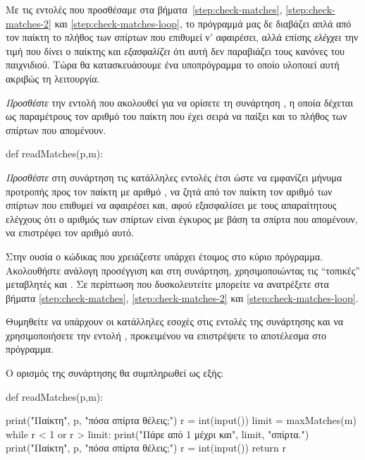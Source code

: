 \documentclass[a4paper,11pt,oneside]{book}
\begin{document}
\begin{step}
Με τις εντολές που προσθέσαμε στα βήματα~\ref{step:check-matches}, \ref{step:check-matches-2} και \ref{step:check-matches-loop}, το πρόγραμμά μας δε διαβάζει απλά από τον παίκτη το πλήθος των σπίρτων που επιθυμεί ν' αφαιρέσει, αλλά επίσης \emph{ελέγχει} την τιμή που δίνει ο παίκτης και \emph{εξασφαλίζει} ότι αυτή δεν παραβιάζει τους κανόνες του παιχνιδιού. Τώρα θα κατασκευάσουμε ένα υποπρόγραμμα το οποίο υλοποιεί αυτή ακριβώς τη λειτουργία.

\emph{Προσθέστε} την εντολή που ακολουθεί για να ορίσετε τη συνάρτηση , η οποία δέχεται ως παραμέτρους τον αριθμό  του παίκτη που έχει σειρά να παίξει και το πλήθος  των σπίρτων που απομένουν.

\begin{pynew}
def readMatches(p,m):            
\end{pynew} 

\emph{Προσθέστε} στη συνάρτηση τις κατάλληλες εντολές έτσι ώστε να εμφανίζει μήνυμα προτροπής προς τον παίκτη με αριθμό , να ζητά από τον παίκτη τον αριθμό των σπίρτων που επιθυμεί να αφαιρέσει και, αφού εξασφαλίσει με τους απαραίτητους ελέγχους ότι ο αριθμός των σπίρτων είναι έγκυρος με βάση τα σπίρτα  που απομένουν, να επιστρέφει τον αριθμό αυτό.

\begin{note}
Στην ουσία ο κώδικας που χρειάζεστε υπάρχει έτοιμος στο κύριο πρόγραμμα. Ακολουθήστε ανάλογη προσέγγιση και στη συνάρτηση, χρησιμοποιώντας τις ``τοπικές'' μεταβλητές  και . Σε περίπτωση που δυσκολευτείτε μπορείτε να ανατρέξετε στα βήματα \ref{step:check-matches}, \ref{step:check-matches-2} και \ref{step:check-matches-loop}. 

Θυμηθείτε να υπάρχουν οι κατάλληλες εσοχές στις εντολές της συνάρτησης και να χρησιμοποιήσετε την εντολή , προκειμένου να επιστρέψετε το αποτέλεσμα στο πρόγραμμα.
\end{note}

\begin{answer}
Ο ορισμός της συνάρτησης  θα συμπληρωθεί ως εξής:

\begin{pyplain}
def readMatches(p,m):            
\end{pyplain}
\begin{pynew}
    print("Παίκτη", p, "πόσα σπίρτα θέλεις;")
    r = int(input())
    limit = maxMatches(m)
    while r < 1 or r > limit:
        print("Πάρε από 1 μέχρι και", limit, "σπίρτα.")
        print("Παίκτη", p, "πόσα σπίρτα θέλεις;")
        r = int(input())
    return r
\end{pynew}


\end{answer}
\end{step}
\end{document}
